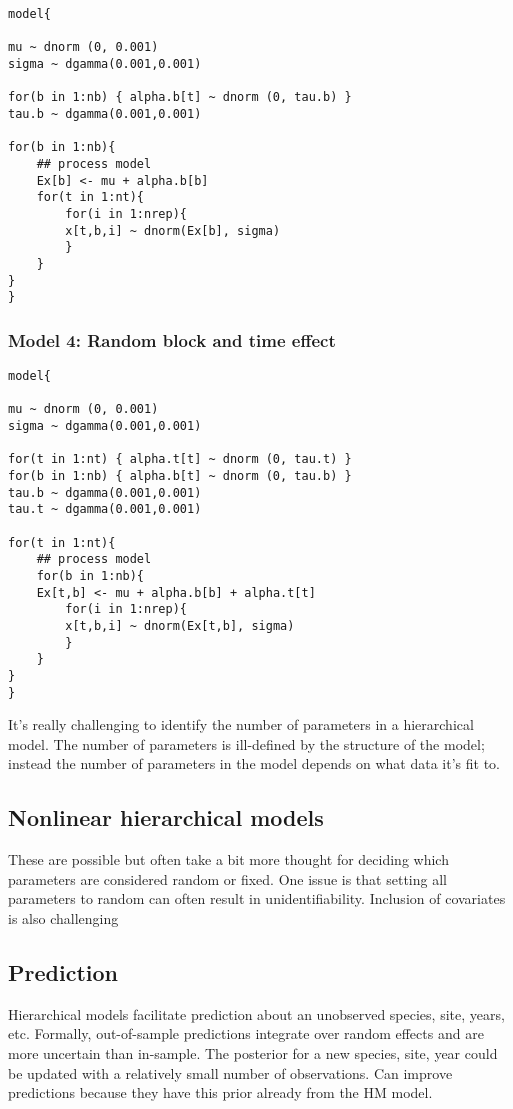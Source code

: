 \documentclass[12pt, oneside]{article}   	%
\begin{document}
\begin{lstlisting}
model{

mu ~ dnorm (0, 0.001)
sigma ~ dgamma(0.001,0.001)

for(b in 1:nb) { alpha.b[t] ~ dnorm (0, tau.b) }
tau.b ~ dgamma(0.001,0.001)

for(b in 1:nb){
	## process model
	Ex[b] <- mu + alpha.b[b]
	for(t in 1:nt){
		for(i in 1:nrep){
		x[t,b,i] ~ dnorm(Ex[b], sigma)
		}
	}
}
}

\end{lstlisting}

\subsubsection{Model 4: Random block and time effect}

\begin{lstlisting}
model{

mu ~ dnorm (0, 0.001)
sigma ~ dgamma(0.001,0.001)

for(t in 1:nt) { alpha.t[t] ~ dnorm (0, tau.t) }
for(b in 1:nb) { alpha.b[t] ~ dnorm (0, tau.b) }
tau.b ~ dgamma(0.001,0.001)
tau.t ~ dgamma(0.001,0.001)

for(t in 1:nt){
	## process model
	for(b in 1:nb){
	Ex[t,b] <- mu + alpha.b[b] + alpha.t[t]
		for(i in 1:nrep){
		x[t,b,i] ~ dnorm(Ex[t,b], sigma)
		}
	}
}
}

\end{lstlisting}

It's really challenging to identify the number of parameters in a hierarchical model. The number of parameters is ill-defined by the structure of the model; instead the number of parameters in the model depends on what data it's fit to. 

\subsection{Nonlinear hierarchical models}

These are possible but often take a bit more thought for deciding which parameters are considered random or fixed. One issue is that setting all parameters to random can often result in unidentifiability. Inclusion of covariates is also challenging

\subsection{Prediction}

Hierarchical models facilitate prediction about an unobserved species, site, years, etc. Formally, out-of-sample predictions integrate over random effects and are more uncertain than in-sample. The posterior for a new species, site, year could be updated with a relatively small number of observations. Can improve predictions because they have this prior already from the HM model.
\end{document}
